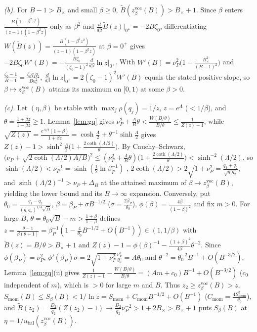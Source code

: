 \documentclass[11pt]{article}
\begin{document}
\emph{(b).} For $B-1>B_\times$ and small $\beta\ge0$, $\tilde B(z^{\mathrm{voc}}_\beta(B))>B_\times+1$. Since $\beta$ enters $\frac{B(1-\beta^2z^2)}{(z-1)(1-\beta^2z)}$ only as $\beta^2$ and $\frac d{d\beta}\tilde B(z)\big|_{0^+}=-2B\zeta_0$, differentiating $W(\tilde B(z))=\frac{B(1-\beta^2z^2)}{(z-1)(1-\beta^2z)}$ at $\beta=0^+$ gives $-2B\zeta_0W'(B)=-\frac{B\zeta_0}{(\zeta_0-1)^2}\frac d{d\beta}\ln z\big|_{0^+}$. With $W'(B)=\nu_P^2\big(1-\frac{B_\times^2}{(B-1)^2}\big)$ and $\frac{\zeta_0-1}{B-1}=\frac{\zeta_0q_1q_2}{Bu_0^2}$, $\frac d{d\beta}\ln z\big|_{0^+}=2(\zeta_0-1)^2W'(B)$ equals the stated positive slope, so $\beta\mapsto z^{\mathrm{voc}}_\beta(B)$ attains its maximum on $[0,1)$ at some $\beta>0$.

\emph{(c).} Let $(\eta,\beta)$ be stable with $\max_j\rho(q_j)=1/z$, $z=e^\Lambda$ ($<1/\beta$), and $\theta=\frac{1+\beta z}{1-\beta z}\ge1$. Lemma~\ref{lem:gq} gives $\nu_P^2+\frac AB\theta<\frac{W(B/\theta)}{B/\theta}\le\frac1{Z(z)-1}$, while $\sqrt{Z(z)}=\frac{e^{\Lambda/2}(1+\beta)}{1+\beta z}=\cosh\frac\Lambda2+\theta^{-1}\sinh\frac\Lambda2$ gives $Z(z)-1>\sinh^2\frac\Lambda2\big(1+\frac{2\coth(\Lambda/2)}\theta\big)$. By Cauchy--Schwarz, $\big(\nu_P+\sqrt{2\coth(\Lambda/2)A/B}\big)^2\le(\nu_P^2+\frac AB\theta)\big(1+\frac{2\coth(\Lambda/2)}\theta\big)<\sinh^{-2}(\Lambda/2)$, so $\sinh(\Lambda/2)<\nu_P^{-1}=\sinh(\frac12\ln\beta_P^{-1})$ \citep[cf.\ Lemma~H.14]{everett2026sparse}, $2\coth(\Lambda/2)>2\sqrt{1+\nu_P^2}=\frac{q_1+q_2}{\sqrt{q_1q_2}}$, and $\sinh(\Lambda/2)^{-1}>\nu_P+\Delta_B$ at the attained maximum of $\beta\mapsto z^{\mathrm{voc}}_\beta(B)$, yielding the lower bound and its $B\to\infty$ expansion. Conversely, put $\theta_0=\frac{q_1-q_2}{(q_1q_2)^{1/4}\sqrt{\bar D}}$, $\beta=\beta_P+\sigma B^{-1/2}$ ($\sigma=\frac{2\beta_P}{\theta_0}$), $\phi(\beta)=\frac{4\beta}{(1-\beta)^2}$ and fix $m>0$. For large $B$, $\theta=\theta_0\sqrt B-m>\frac{1+\beta}{1-\beta}$ defines $z=\frac{\theta-1}{\beta(\theta+1)}=\beta_P^{-1}(1-\frac4{\theta_0}B^{-1/2}+O(B^{-1}))\in(1,1/\beta)$ with $\tilde B(z)=B/\theta>B_\times+1$ and $Z(z)-1=\phi(\beta)^{-1}-\frac{(1+\beta)^2}{4\beta}\theta^{-2}$. Since $\phi(\beta_P)=\nu_P^2$, $\phi'(\beta_P)\sigma=2\sqrt{1+\nu_P^2}\frac{\nu_P^2}{\theta_0}=A\theta_0$ and $\theta^{-2}=\theta_0^{-2}B^{-1}+O(B^{-3/2})$, Lemma~\ref{lem:gq}(ii) gives $\frac1{Z(z)-1}-\frac{W(B/\theta)}{B/\theta}=(Am+c_0)B^{-1}+O(B^{-3/2})$ ($c_0$ independent of $m$), which is $>0$ for large $m$ and $B$. Thus $z_2\ge z^{\mathrm{voc}}_\beta(B)>z$, $S_{\mathrm{mom}}(B)\le S_\beta(B)<1/\ln z=S_{\mathrm{mom}}+C_{\mathrm{mom}}B^{-1/2}+O(B^{-1})$ ($C_{\mathrm{mom}}=\frac{4S_{\mathrm{mom}}^2}{\theta_0}$), and $\tilde B(z_2)=\frac{D_2}{q_2}(Z(z_2)-1)\to\frac{D_2}{q_2}\nu_P^{-2}>1+2B_\times>B_\times+1$ puts $S_\beta(B)$ at $\eta=1/u_{\mathrm{bal}}(z^{\mathrm{voc}}_\beta(B))$.
\end{document}
